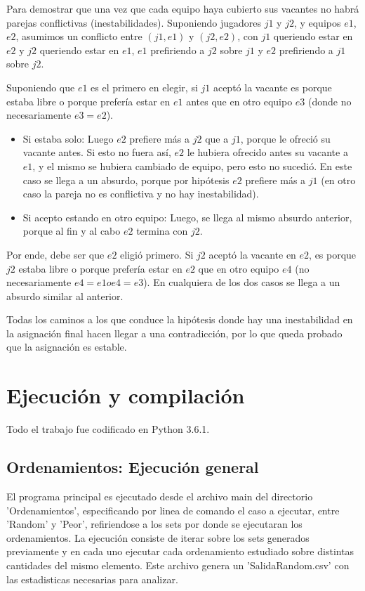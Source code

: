 \documentclass[article,a4paper]{article}
\begin{document}
Para demostrar que una vez que cada equipo haya cubierto sus vacantes no habrá parejas conflictivas (inestabilidades). Suponiendo jugadores $j1$ y $j2$, y equipos $e1$, $e2$, asumimos un conflicto entre $(j1,e1)$ y $(j2,e2)$, con $j1$ queriendo estar en $e2$ y $j2$ queriendo estar en $e1$, $e1$ prefiriendo a $j2$ sobre $j1$ y $e2$ prefiriendo a $j1$ sobre $j2$.

Suponiendo que $e1$ es el primero en elegir, si $j1$ aceptó la vacante es porque estaba libre o porque prefería estar en $e1$ antes que en otro equipo $e3$ (donde no necesariamente $e3 = e2$).

\begin{itemize}
\item{Si estaba solo: } Luego $e2$ prefiere más a $j2$ que a $j1$, porque le ofreció su vacante antes. Si esto no fuera así, $e2$ le hubiera ofrecido antes su vacante a $e1$, y el mismo se hubiera cambiado de equipo, pero esto no sucedió. En este caso se llega a un absurdo, porque por hipótesis $e2$ prefiere más a $j1$ (en otro caso la pareja no es conflictiva y no hay inestabilidad).
\item{Si acepto estando en otro equipo: } Luego, se llega al mismo absurdo anterior, porque al fin y al cabo $e2$ termina con $j2$.
\end{itemize}

Por ende, debe ser que $e2$ eligió primero. Si $j2$ aceptó la vacante en $e2$, es porque $j2$ estaba libre o porque prefería estar en $e2$ que en otro equipo $e4$ (no necesariamente $e4 = e1 o e4 = e3$). En cualquiera de los dos casos se llega a un absurdo similar al anterior.

Todas los caminos a los que conduce la hipótesis donde hay una inestabilidad en la asignación final hacen llegar a una contradicción, por lo que queda probado que la asignación es estable.


\newpage
\appendix

\section{Ejecución y compilación}

Todo el trabajo fue codificado en Python 3.6.1.

\subsection{Ordenamientos: Ejecución general}

El programa principal es ejecutado desde el archivo main del directorio 'Ordenamientos', especificando por linea de comando el caso a ejecutar, entre 'Random' y 'Peor', refiriendose a los sets por donde se ejecutaran los ordenamientos. La ejecución consiste de iterar sobre los sets generados previamente y en cada uno ejecutar cada ordenamiento estudiado sobre distintas cantidades del mismo elemento. Este archivo genera un 'SalidaRandom.csv' con las estadisticas necesarias para analizar.
\end{document}
